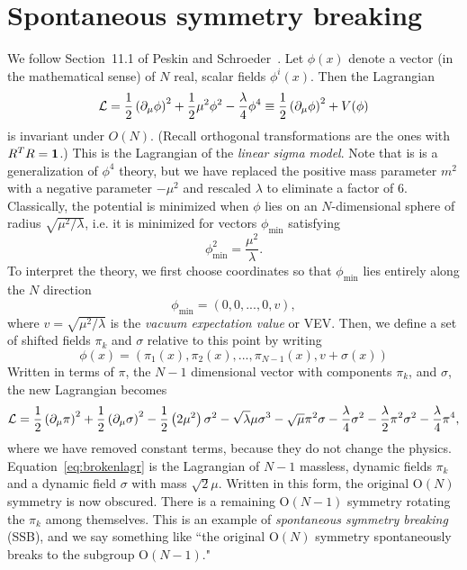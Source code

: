 \section{Spontaneous symmetry breaking}\label{sec:ssb}
We follow Section~11.1 of Peskin and 
Schroeder~\cite{peskin_introduction_1995}.
Let $\phi(x)$ denote a vector (in the mathematical sense) of $N$ real,
scalar fields $\phi^i(x)$. Then the Lagrangian
\begin{equation}
  \mathcal{L}=\frac{1}{2}\left(\partial_\mu\phi\right)^2
        +\frac{1}{2}\mu^2\phi^2-\frac{\lambda}{4}\phi^4
       \equiv\frac{1}{2}\left(\partial_\mu\phi\right)^2
        +V(\phi)
\end{equation}
is invariant under $O(N)$. (Recall orthogonal transformations are the
ones with $R^TR={\mathbf 1}$.) This is the Lagrangian of the {\it linear
sigma model}. Note that is is a generalization of $\phi^4$ theory,
but we have replaced the positive mass parameter $m^2$ with a
negative parameter $-\mu^2$ and rescaled $\lambda$ to eliminate a factor of 6.
Classically, the potential is minimized when $\phi$ lies
on an $N$-dimensional sphere of radius $\sqrt{\mu^2/\lambda}$, i.e. 
it is minimized for vectors $\phi_\text{min}$ satisfying
\begin{equation}
  \phi_\text{min}^2=\frac{\mu^2}{\lambda}.
\end{equation}
To interpret the theory, we first choose coordinates so that 
$\phi_\text{min}$ lies
entirely along the $N$ direction
\begin{equation}\label{eq:phidir}
  \phi_\text{min}=(0,0,...,0,v),
\end{equation}
where $v=\sqrt{\mu^2/\lambda}$ is the {\it vacuum expectation value} or VEV.
Then, we define a set of shifted fields $\pi_k$ and $\sigma$ relative
to this point by writing
\begin{equation}\label{eq:phishift}
  \phi(x)=\left(\pi_1(x),\pi_2(x),...,\pi_{N-1}(x),v+\sigma(x)\right)
\end{equation}
Written in terms of $\pi$, the $N-1$ dimensional vector with components
$\pi_k$, and $\sigma$, the new Lagrangian becomes
\begin{equation}\label{eq:brokenlagr}
  \mathcal{L}=\frac{1}{2}\left(\partial_\mu\pi\right)^2
        +\frac{1}{2}\left(\partial_\mu\sigma\right)^2
        -\frac{1}{2}\left(2\mu^2\right)\sigma^2-\sqrt{\lambda}\mu\sigma^3
        -\sqrt\mu\pi^2\sigma
        -\frac{\lambda}{4}\sigma^2
        -\frac{\lambda}{2}\pi^2\sigma^2
        -\frac{\lambda}{4}\pi^4,
\end{equation}
where we have removed constant terms, because they do not change the
physics. Equation~\eqref{eq:brokenlagr} is the Lagrangian of $N-1$
massless, dynamic fields $\pi_k$ and a dynamic field $\sigma$ with mass
$\sqrt{2}\mu$. Written in this form, the original $\text{O}(N)$ symmetry
is now obscured. There is a remaining $\text{O}(N-1)$ symmetry
rotating the $\pi_k$ among themselves. This is an example of
{\it spontaneous symmetry breaking} (SSB), and we say something like
``the original $\text{O}(N)$ symmetry spontaneously breaks to
the subgroup $\text{O}(N-1)$." 

